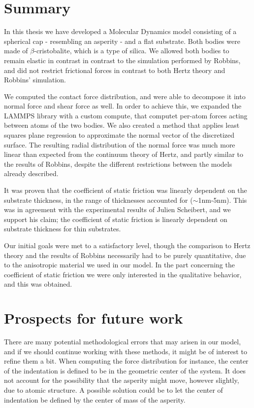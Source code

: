 \documentclass[twoside,english]{uiofysmaster}
\begin{document}

\section{Summary}
In this thesis we have developed a Molecular Dynamics model consisting of a spherical cap - resembling an asperity - and a flat substrate. 
Both bodies were made of $\beta$-cristobalite, which is a type of silica. 
We allowed both bodies to remain elastic in contrast in contrast to the simulation performed by Robbins, and did not restrict frictional forces in contrast to both Hertz theory and Robbins' simulation.

We computed the contact force distribution, and were able to decompose it into normal force and shear force as well.
In order to achieve this, we expanded the LAMMPS library with a custom compute, that computet per-atom forces acting between atoms of the two bodies.
We also created a method that applies least squares plane regression to approximate the normal vector of the discretized surface. 
The resulting radial distribution of the normal force was much more linear than expected from the continuum theory of Hertz, and partly similar to the results of Robbins, despite the different restrictions between the models already described. 

It was proven that the coefficient of static friction was linearly dependent on the substrate thickness, in the range of thicknesses accounted for ($\sim$1nm-5nm). 
This was in agreement with the experimental results of Julien Scheibert, and we support his claim; the coefficient of static friction is linearly dependent on substrate thickness for thin substrates.

Our initial goals were met to a satisfactory level, though the comparison to Hertz theory and the results of Robbins necessarily had to be purely quantitative, due to the anisotropic material we used in our model.    
In the part concerning the coefficient of static friction we were only interested in the qualitative behavior, and this was obtained.




\section{Prospects for future work}
There are many potential methodological errors that may arisen in our model, and if we should continue working with these methods, it might be of interest to refine them a bit.
When computing the force distribution for instance, the center of the indentation is defined to be in the geometric center of the system. 
It does not account for the possibility that the asperity might move, however slightly, due to atomic structure. 
A possible solution could be to let the center of indentation be defined by the center of mass of the asperity. 
\end{document}
